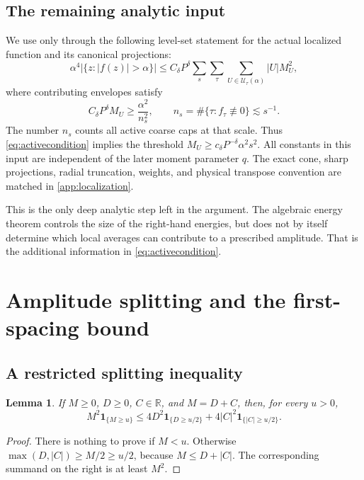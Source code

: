 \documentclass[11pt,reqno]{amsart}
\numberwithin{equation}{section}
\newtheorem{lemma}[lemma]{Lemma}
\theoremstyle{definition}
\theoremstyle{remark}
\newcommand{\R}{\mathbb R}
\newcommand{\one}{\mathbf 1}
\begin{document}
\subsection{The remaining analytic input}
We use \cite[Theorem~2]{GM} only through the following level-set statement for the actual
localized function and its canonical projections:
\begin{equation}\label{eq:GM}
 \alpha^4|\{z:|f(z)|>\alpha\}|
 \le C_\delta P^\delta\sum_s\sum_\tau
       \sum_{U\in\mathcal U_\tau(\alpha)}|U|M_U^2,
\end{equation}
where contributing envelopes satisfy
\begin{equation}\label{eq:activecondition}
 C_\delta P^\delta M_U\ge\frac{\alpha^2}{n_s^2},
 \qquad n_s=\#\{\tau:f_\tau\not\equiv0\}\lesssim s^{-1}.
\end{equation}
The number $n_s$ counts all active coarse caps at that scale.
Thus \eqref{eq:activecondition} implies the threshold
$M_U\ge c_\delta P^{-\delta}\alpha^2s^2$.
All constants in this input are independent of the later moment parameter $q$.
The exact cone, sharp projections, radial truncation, weights, and physical transpose
convention are matched in \cref{app:localization}.

This is the only deep analytic step left in the argument. The algebraic energy theorem
controls the size of the right-hand energies, but does not by itself determine which
local averages can contribute to a prescribed amplitude. That is the additional
information in \eqref{eq:activecondition}.

\section{Amplitude splitting and the first-spacing bound}\label{sec:amplitude}
\subsection{A restricted splitting inequality}
\begin{lemma}\label{lem:split}
If $M\ge0$, $D\ge0$, $C\in\R$, and $M=D+C$, then, for every $u>0$,
\begin{equation}\label{eq:split}
 M^2\one_{\{M\ge u\}}
 \le4D^2\one_{\{D\ge u/2\}}+4|C|^2\one_{\{|C|\ge u/2\}}.
\end{equation}
\end{lemma}
\begin{proof}
There is nothing to prove if $M<u$.
Otherwise $\max(D,|C|)\ge M/2\ge u/2$, because $M\le D+|C|$.
The corresponding summand on the right is at least $M^2$.
\end{proof}
\end{document}
